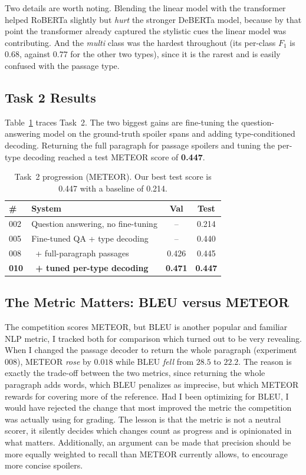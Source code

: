 \documentclass[11pt]{article}
\begin{document}
Two details are worth noting. Blending the linear model with the transformer
helped RoBERTa slightly but \textit{hurt} the stronger DeBERTa model, because by that
point the transformer already captured the stylistic cues the linear model was
contributing. And the \textit{multi} class was the hardest throughout (its
per-class $F_1$ is $0.68$, against $0.77$ for the other two types), since it is
the rarest and is easily confused with the passage type.

\subsection{Task 2 Results}
Table~\ref{tab:task2} traces Task~2. The two biggest gains are fine-tuning the
question-answering model on the ground-truth spoiler spans and adding
type-conditioned decoding. Returning the full paragraph for passage spoilers and
tuning the per-type decoding reached a test METEOR score of \textbf{0.447}.

\begin{table}[t]
\centering\small
\begin{tabular}{@{}llcc@{}}
\toprule
\# & System & Val & Test \\
\midrule
002 & Question answering, no fine-tuning & -- & 0.214 \\
005 & Fine-tuned QA + type decoding & -- & 0.440 \\
008 & \ + full-paragraph passages & 0.426 & 0.445 \\
\textbf{010} & \ \textbf{+ tuned per-type decoding} & \textbf{0.471} & \textbf{0.447} \\
\bottomrule
\end{tabular}
\caption{Task~2 progression (METEOR). Our best test score is 0.447 with a baseline of 0.214.}
\label{tab:task2}
\end{table}

\subsection{The Metric Matters: BLEU versus METEOR}
\label{sec:metric}
The competition scores METEOR, but BLEU is another popular and familiar NLP metric, I
tracked both for comparison which turned out to be very revealing. When I changed the
passage decoder to return the whole paragraph (experiment 008), METEOR
\textit{rose} by $0.018$ while BLEU \textit{fell} from $28.5$ to $22.2$. The reason is
exactly the trade-off between the two metrics, since returning the whole paragraph adds
words, which BLEU penalizes as imprecise, but which METEOR rewards for covering
more of the reference. Had I been optimizing for BLEU, I would have rejected
the change that most improved the metric the competition was actually using for grading. The lesson
is that the metric is not a neutral scorer, it silently decides which changes count as progress and is opinionated in what matters. Additionally, an argument can be made that precision should be more equally weighted to recall than METEOR currently allows, to encourage more concise spoilers.
\end{document}
